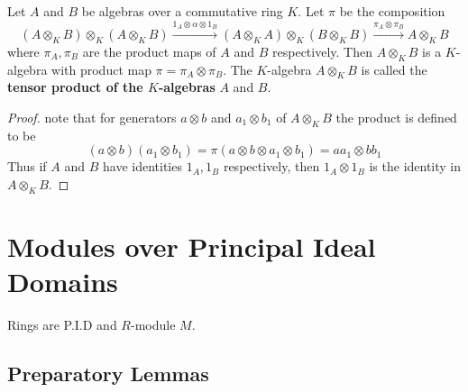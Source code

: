 \begin{theorem}
    Let $A$ and $B$ be algebras over a commutative ring $K$.
    Let $\pi$ be the composition
    \begin{equation*}
        \left(A \otimes_K B\right) \otimes_K
        \left(A\otimes_K B\right)
        \xrightarrow{1_A \otimes \alpha \otimes 1_B}
        \left(A \otimes_K A\right) \otimes_K \left(B \otimes_K B\right)
        \xrightarrow{\pi_A \otimes \pi_B} A \otimes_K B
    \end{equation*}
    where $\pi_{{A}}, \pi_{{B}}$ are the product maps of $A$ and $B$ respectively.
    Then ${A} \otimes_{{K}} B$ is a $K$-algebra with product map $\pi=\pi_A\otimes \pi_B$.
    The $K$-algebra $A \otimes_K B$ is called the \textbf{tensor product of the $K$-algebras} $A$ and $B$.
    \begin{proof}
        note that for generators $a \otimes b$ and $a_1 \otimes b_1$ of $A \otimes_K B$ the product is defined to be
        \begin{equation*}
            (a \otimes b)\left(a_1 \otimes b_1\right)=\pi\left(a \otimes b \otimes a_1 \otimes b_1\right)=a a_1 \otimes b b_1
        \end{equation*}
        Thus if $A$ and $B$ have identities $1_A, 1_B$ respectively, then $1_A \otimes 1_B$ is the identity in $A \otimes_K B$.
    \end{proof}

\end{theorem}


\section{Modules over Principal Ideal Domains}
Rings are P.I.D and $R$-module $M$.
\subsection{Preparatory Lemmas} %

